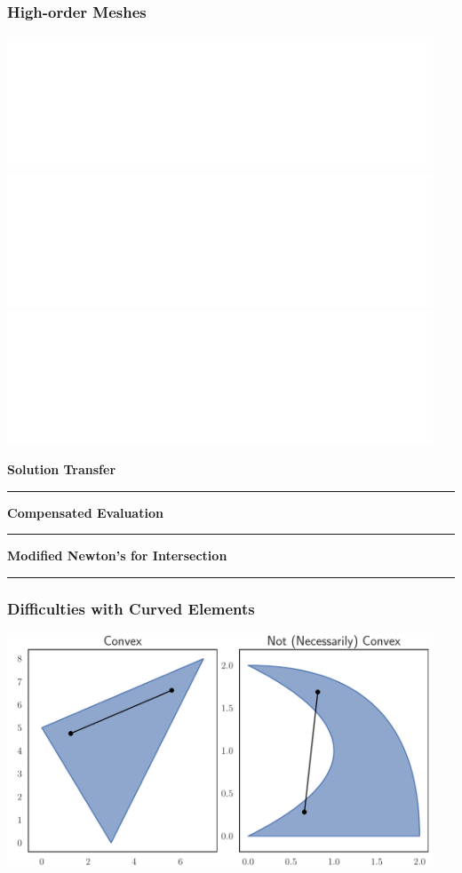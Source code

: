 \documentclass{beamer}
\begin{document}
\begin{frame}
\frametitle{High-order Meshes}
\begin{center}
\includegraphics<1>[width=0.95\textwidth]
                   {../images/slides/element_distortion1.pdf}
\includegraphics<2>[width=0.95\textwidth]
                   {../images/slides/element_distortion2.pdf}
\includegraphics<3>[width=0.95\textwidth]
                   {../images/slides/element_distortion3.pdf}
\end{center}
\end{frame}


\begin{frame}
\centering
{\Large \bf Solution Transfer}
\rule{0.82\textwidth}{1pt}
\end{frame}


\begin{frame}
\centering
{\Large \bf Compensated Evaluation}
\rule{0.82\textwidth}{1pt}
\end{frame}


\begin{frame}
\centering
{\Large \bf Modified Newton's for Intersection}
\rule{0.82\textwidth}{1pt}
\end{frame}

\begin{frame}
\frametitle{Difficulties with Curved Elements}
\begin{center}
\includegraphics[width=0.95\textwidth]
                {../images/slides/not_convex.pdf}
\end{center}
\end{frame}
\end{document}
